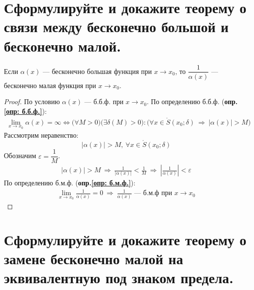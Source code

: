 \newpage
\section{Сформулируйте и докажите теорему о связи между бесконечно большой и бесконечно малой.}

\begin{theorem}
  Если $\alpha(x)$ --- бесконечно большая функция при $x \to x_0$, то $\dfrac{1}{\alpha(x)}$ --- бесконечно малая функция при $x \to x_0$.
\end{theorem}
\begin{proof}
  По условию $\alpha(x)$ --- б.б.ф. при $x \to x_0$. По определению б.б.ф. (\textbf{опр.\ref{опр: б.б.ф.}}):
  \begin{gather*}
    \lim_{x \to x_0} \alpha(x) = \infty \iff \big(\forall M > 0\big)\big(\exists \delta(M) > 0\big)\colon \big(\forall x \in \mathring{S}(x_0; \delta)\ \Rightarrow\ |\alpha(x)| > M\big)
  \end{gather*}
  Рассмотрим неравенство: \[
    |\alpha(x)| > M,\ \forall x \in \mathring{S}(x_0; \delta)
  \]
  Обозначим $\varepsilon = \dfrac{1}{M}$.
  \begin{gather*}
    |\alpha(x)| > M\ \Rightarrow\ \frac{1}{|\alpha(x)|} < \frac{1}{M}
   \ \Rightarrow\ \left| \frac{1}{\alpha(x)} \right| < \varepsilon
  \end{gather*}
  По определению б.м.ф. (\textbf{опр.\ref{опр: б.м.ф.}}):
  \begin{gather*}
    \lim\limits_{x \to x_0} \frac{1}{\alpha(x)} = 0\ \Rightarrow\ \frac{1}{\alpha(x)} \text{ --- б.м.ф при } x\to x_0
  \end{gather*}
\end{proof}

\section{Сформулируйте и докажите теорему о замене бесконечно малой на эквивалентную под знаком предела.}

